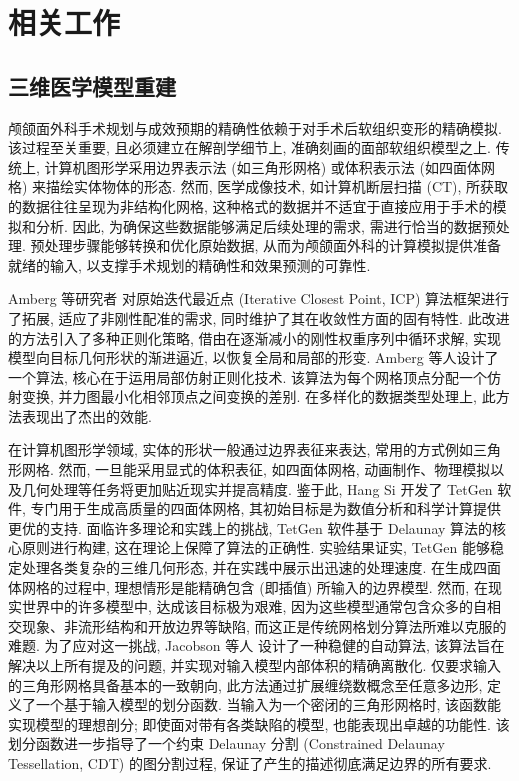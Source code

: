 
\chapter{相关工作}
\label{cha:related-work}

\section{三维医学模型重建}

颅颌面外科手术规划与成效预期的精确性依赖于对手术后软组织变形的精确模拟.
该过程至关重要, 且必须建立在解剖学细节上, 准确刻画的面部软组织模型之上.
传统上, 计算机图形学采用边界表示法 (如三角形网格) 或体积表示法 (如四面体网格) 来描绘实体物体的形态.
然而, 医学成像技术, 如计算机断层扫描 (CT), 所获取的数据往往呈现为非结构化网格, 这种格式的数据并不适宜于直接应用于手术的模拟和分析.
因此, 为确保这些数据能够满足后续处理的需求, 需进行恰当的数据预处理.
预处理步骤能够转换和优化原始数据, 从而为颅颌面外科的计算模拟提供准备就绪的输入, 以支撑手术规划的精确性和效果预测的可靠性.

Amberg 等研究者 \cite{ambergOptimalStepNonrigid2007} 对原始迭代最近点 (Iterative Closest Point, ICP) 算法框架进行了拓展, 适应了非刚性配准的需求, 同时维护了其在收敛性方面的固有特性.
此改进的方法引入了多种正则化策略, 借由在逐渐减小的刚性权重序列中循环求解, 实现模型向目标几何形状的渐进逼近, 以恢复全局和局部的形变.
Amberg 等人设计了一个算法, 核心在于运用局部仿射正则化技术.
该算法为每个网格顶点分配一个仿射变换, 并力图最小化相邻顶点之间变换的差别.
在多样化的数据类型处理上, 此方法表现出了杰出的效能.

在计算机图形学领域, 实体的形状一般通过边界表征来表达, 常用的方式例如三角形网格.
然而, 一旦能采用显式的体积表征, 如四面体网格, 动画制作、物理模拟以及几何处理等任务将更加贴近现实并提高精度.
鉴于此, Hang Si \cite{siTetGenDelaunaybasedQuality2015} 开发了 TetGen 软件, 专门用于生成高质量的四面体网格, 其初始目标是为数值分析和科学计算提供更优的支持.
面临许多理论和实践上的挑战, TetGen 软件基于 Delaunay 算法的核心原则进行构建, 这在理论上保障了算法的正确性.
实验结果证实, TetGen 能够稳定处理各类复杂的三维几何形态, 并在实践中展示出迅速的处理速度.
在生成四面体网格的过程中, 理想情形是能精确包含 (即插值) 所输入的边界模型.
然而, 在现实世界中的许多模型中, 达成该目标极为艰难, 因为这些模型通常包含众多的自相交现象、非流形结构和开放边界等缺陷, 而这正是传统网格划分算法所难以克服的难题.
为了应对这一挑战, Jacobson 等人 \cite{jacobsonRobustInsideoutsideSegmentation2013} 设计了一种稳健的自动算法, 该算法旨在解决以上所有提及的问题, 并实现对输入模型内部体积的精确离散化.
仅要求输入的三角形网格具备基本的一致朝向, 此方法通过扩展缠绕数概念至任意多边形, 定义了一个基于输入模型的划分函数.
当输入为一个密闭的三角形网格时, 该函数能实现模型的理想剖分; 即使面对带有各类缺陷的模型, 也能表现出卓越的功能性.
该划分函数进一步指导了一个约束 Delaunay 分割 (Constrained Delaunay Tessellation, CDT) 的图分割过程, 保证了产生的描述彻底满足边界的所有要求.

